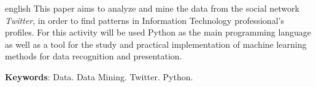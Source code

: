\begin{resumo}[ABSTRACT]
 \begin{otherlanguage*}{english}
This paper aims to analyze and mine the data from the social network \textit{Twitter}, in order to find patterns in Information Technology professional's profiles. For this activity will be used Python as the main programming language as well as a tool for the study and practical implementation of machine learning methods for data recognition and presentation.
   
   \vspace{\onelineskip}
 
   \noindent 
   \textbf{Keywords}: Data. Data Mining. Twitter. Python.
 \end{otherlanguage*}
\end{resumo}
